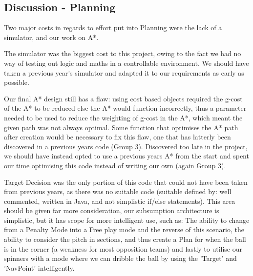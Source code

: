 \subsection{Discussion - Planning}


Two major costs in regards to effort put into Planning were the lack of a 
simulator, and our work on A*. 

The simulator was the biggest cost to this project, owing to the fact we had
no way of testing out logic and maths in a controllable environment. We should
have taken a previous year's simulator and adapted it to our requirements as
early as possible. 

Our final A* design still has a flaw: using cost based objects required the 
g-cost of the A* to be reduced else the A* would function incorrectly, thus a 
parameter needed to be used to reduce the weighting of g-cost in the A*, which 
meant the given path was not always optimal. Some function that optimises the A* 
path after creation would be necessary to fix this flaw, one that has latterly 
been discovered in a previous years code (Group 3). Discovered too late 
in the project, we should have instead opted to use a previous years A* from the 
start and spent our time optimising this code instead of writing our own 
(again Group 3).

Target Decision was the only portion of this code that could not have been 
taken from previous years, as there was no suitable code (suitable defined by:
well commented, written in Java, and not simplistic if/else statements). This 
area should be given far more consideration, our subsumption architecture is
simplistic, but it has scope for more intelligent use, such as: The ability to
change from a Penalty Mode into a Free play mode and the reverse of this 
scenario, the ability to consider the pitch in sections, and thus create a Plan
for when the ball is in the corner (a weakness for most opposition teams) and lastly 
to utilise our spinners with a mode where we can dribble the ball by using the 
'Target' and 'NavPoint' intelligently.


